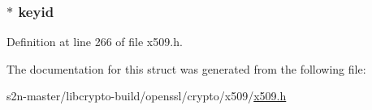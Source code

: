 \subsubsection[{\texorpdfstring{keyid}{keyid}}]{ $\ast$ keyid}\hypertarget{structx509__cert__aux__st_a83b8c0c8f3cd449651cb7aa12553acc8}{}\label{structx509__cert__aux__st_a83b8c0c8f3cd449651cb7aa12553acc8}


Definition at line 266 of file x509.\+h.



The documentation for this struct was generated from the following file\+:\begin{DoxyCompactItemize}
\item 
s2n-\/master/libcrypto-\/build/openssl/crypto/x509/\hyperlink{crypto_2x509_2x509_8h}{x509.\+h}\end{DoxyCompactItemize}
